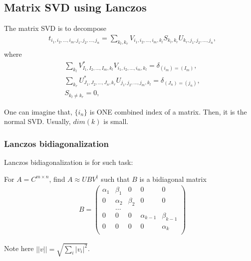 \subsection{\label{sec:LanczosSVD}Matrix SVD using Lanczos}

The matrix SVD is to decompose
\begin{equation}
\begin{split}
&t_{i_1,i_2,\ldots,i_m,j_1,j_2,\ldots,j_n} = \sum _{k_l,k_r} V_{i_1,i_2,\ldots,i_m,k_l}S_{k_l,k_r} U_{k_r,j_1,j_2,\ldots,j_n},\\
\end{split}
\end{equation}
where
\begin{equation}
\begin{split}
&\sum _{k_l} V^*_{I_1,I_2,\ldots,I_m,k_l}V_{i_1,i_2,\ldots,i_m,k_l}=\delta _{(i_m)=(I_m)},\\
&\sum _{k_r} U^*_{J_1,J_2,\ldots,J_n,k_r}U_{j_1,j_2,\ldots,j_m,k_l}=\delta _{(J_n)=(j_n)},\\
&S_{k_l\neq k_r}=0,
\end{split}
\end{equation}

One can imagine that, $\{i_n\}$ is ONE combined index of a matrix.
Then, it is the normal SVD.
Usually, $dim(k)$ is small.

\subsubsection{\label{sec:LanczosBidiagonalization}Lanczos bidiagonalization}

Lanczos bidiagonalization is for such task:

For $A=C^{m\times n}$, find $A\approx UB V^{\dagger}$ such that $B$ is a bidiagonal matrix
\begin{equation}
\begin{split}
&B=\begin{pmatrix}
\alpha _1 & \beta_1 & 0 & 0 & 0 \\
 0 & \alpha_2 & \beta_2 & 0 & 0 \\
 & \ldots &  &  &  \\
 0 & 0 & 0 & \alpha _{k-1}  &  \beta _ {k-1}\\
 0 & 0 & 0 & 0 & \alpha _k \\
\end{pmatrix}
\end{split}
\end{equation}

Note here $||v|| = \sqrt{\sum _i |v_i|^2}$.

